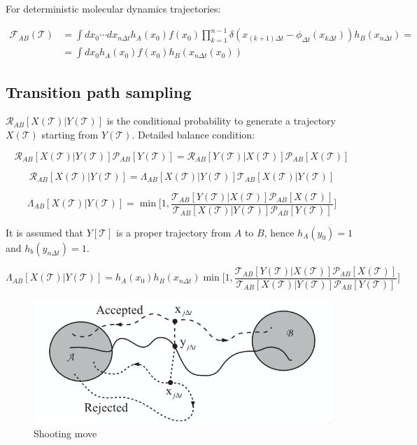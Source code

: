 For deterministic molecular dynamics trajectories:

\begin{align*}
	\mathcal{F}_{AB}(\mathcal{T}) &= \int dx_0\cdots dx_{n\Delta t}h_A(x_0)f(x_0)\prod\limits_{k=1}^{n-1}\delta(x_{(k+1)\Delta t}-\phi_{\Delta t}(x_{k\Delta t}))h_B(x_{n\Delta t}) = \\
																&=\int dx_0h_A(x_0)f(x_0)h_B(x_{n\Delta t}(x_0))
\end{align*}

	\subsection{Transition path sampling}
	$\mathcal{R}_{AB}[X(\mathcal{T})|Y(\mathcal{T})]$ is the conditional probability to generate a trajectory $X(\mathcal{T})$ starting from $Y(\mathcal{T})$.
	Detailed balance condition:

	$$\mathcal{R}_{AB}[X(\mathcal{T})|Y(\mathcal{T})]\mathcal{P}_{AB}[Y(\mathcal{T})] = \mathcal{R}_{AB}[Y(\mathcal{T})|X(\mathcal{T})]\mathcal{P}_{AB}[X(\mathcal{T})]$$

	$$\mathcal{R}_{AB}[X(\mathcal{T})|Y(\mathcal{T})] = \Lambda_{AB}[X(\mathcal{T})|Y(\mathcal{T})]\mathcal{T}_{AB}[X(\mathcal{T})|Y(\mathcal{T})]$$

	$$\Lambda_{AB}[X(\mathcal{T})|Y(\mathcal{T})] = \min\biggl[1, \frac{\mathcal{T}_{AB}[Y(\mathcal{T})|X(\mathcal{T})]\mathcal{P}_{AB}[X(\mathcal{T})]}{\mathcal{T}_{AB}[X(\mathcal{T})|Y(\mathcal{T})]\mathcal{P}_{AB}[Y(\mathcal{T})]}\biggr]$$

	It is assumed that $Y[\mathcal{T}]$ is a proper trajectory from $A$ to $B$, hence $h_A(y_0) = 1$ and $h_b(y_{n\Delta t}) = 1$.

	$$\Lambda_{AB}[X(\mathcal{T})|Y(\mathcal{T})] = h_A(x_0)h_B(x_{n\Delta t})\min\biggl[1, \frac{\mathcal{T}_{AB}[Y(\mathcal{T})|X(\mathcal{T})]\mathcal{P}_{AB}[X(\mathcal{T})]}{\mathcal{T}_{AB}[X(\mathcal{T})|Y(\mathcal{T})]\mathcal{P}_{AB}[Y(\mathcal{T})]}\biggr]$$

	\begin{figure}[H]
		\includegraphics[width=\textwidth]{transition-path-sampling}
		\caption{Shooting move}
		\label{fig:shooting-move}
	\end{figure}


